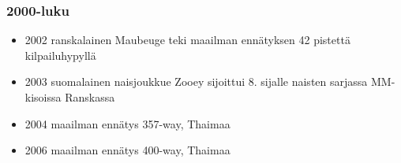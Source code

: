 \subsubsection{ 2000-luku }
\label{yleista-fs-hyppaamisesta-2000-luku}

\begin{itemize}
\item  2002 ranskalainen Maubeuge teki maailman ennätyksen 42 pistettä kilpailuhypyllä  
\item  2003 suomalainen naisjoukkue Zooey sijoittui 8. sijalle naisten sarjassa MM-kisoissa Ranskassa  
\item  2004 maailman ennätys 357-way, Thaimaa 
\item  2006 maailman ennätys 400-way, Thaimaa 
\end{itemize}
